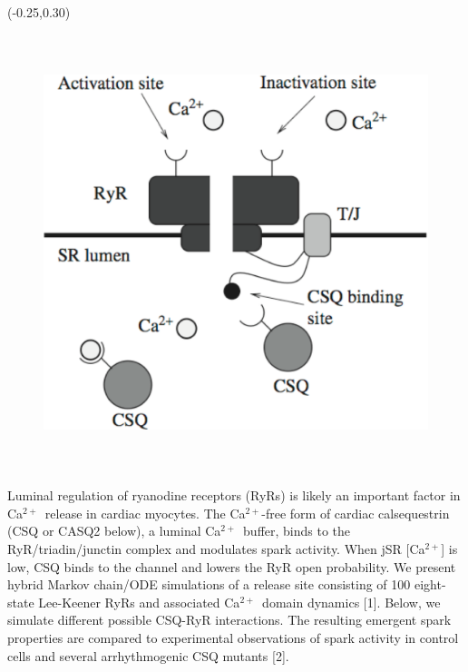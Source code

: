 \documentclass[a0]{a0poster}
\def\Ca{Ca$^{2+}$}
\def\Head#1{\noindent{\begin{center}\LARGE\color{DarkBlue} #1\end{center}}}
\begin{document}
\begin{textblock}{5}(-0.25,0.30)
\Head{--- Abstract ---}
\vspace{-0.3in}


\begin{figure}
\begin{center}

{\includegraphics*[height=5in]{pics/CSQ_binding}}
\label{fig:CSQ}
\end{center}
\end{figure}

Luminal regulation of ryanodine receptors (RyRs) is likely an important factor in \Ca\ release in cardiac myocytes. The \Ca-free form of cardiac calsequestrin (CSQ  or CASQ2 below), a luminal \Ca\ buffer, binds to the RyR/triadin/junctin complex and modulates spark activity. When jSR [\Ca] is low, CSQ binds to the channel and lowers the RyR open probability. We present hybrid Markov chain/ODE simulations of a release site consisting of 100 eight-state Lee-Keener RyRs and associated \Ca\ domain dynamics [1]. Below, we simulate different possible CSQ-RyR interactions. The resulting emergent spark properties are compared to experimental observations of spark activity in control cells and several arrhythmogenic CSQ mutants [2].



\end{textblock}
\end{document}

